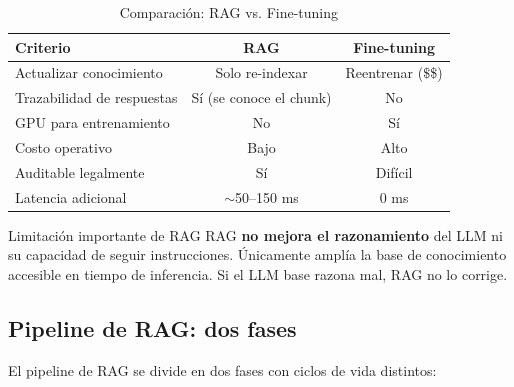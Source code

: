 \documentclass[12pt,a4paper]{article}
\begin{document}
\begin{table}[H]
\centering
\caption{Comparación: RAG vs. Fine-tuning}
\begin{tabular}{lcc}
\toprule
\textbf{Criterio} & \textbf{RAG} & \textbf{Fine-tuning} \\
\midrule
Actualizar conocimiento & Solo re-indexar & Reentrenar ($\$$\$) \\
Trazabilidad de respuestas & Sí (se conoce el chunk) & No \\
GPU para entrenamiento & No & Sí \\
Costo operativo & Bajo & Alto \\
Auditable legalmente & Sí & Difícil \\
Latencia adicional & $\sim$50--150 ms & 0 ms \\
\bottomrule
\end{tabular}
\end{table}

\begin{infobox}{Limitación importante de RAG}
RAG \textbf{no mejora el razonamiento} del LLM ni su capacidad de seguir
instrucciones. Únicamente amplía la base de conocimiento accesible en
tiempo de inferencia. Si el LLM base razona mal, RAG no lo corrige.
\end{infobox}

\subsection{Pipeline de RAG: dos fases}

El pipeline de RAG se divide en dos fases con ciclos de vida distintos:
\end{document}
